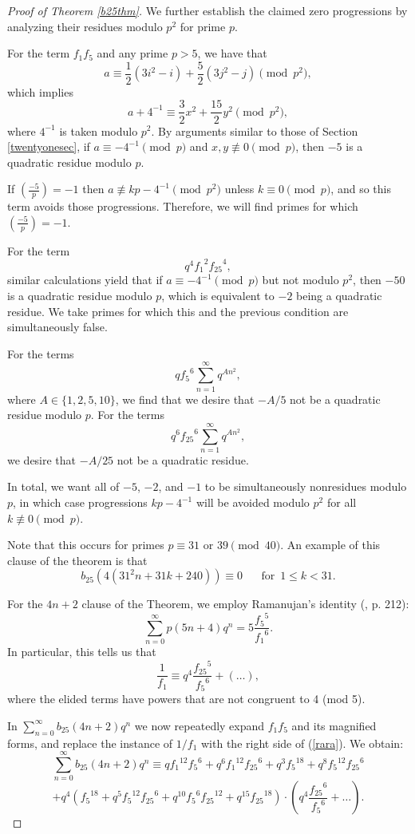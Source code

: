 \documentclass[12pt]{amsart}
\theoremstyle{definition}
\begin{document}
\begin{proof}[Proof of Theorem \ref{b25thm}]
We further establish the claimed zero progressions by analyzing their residues modulo $p^2$ for prime $p$.

For the term $f_1 f_5$ and any prime $p > 5$, we have that $$a \equiv \frac{1}{2}(3i^2-i) + \frac{5}{2}(3j^2 - j) \pmod{p^2},$$
which implies $$a + 4^{-1} \equiv \frac{3}{2} x^2 + \frac{15}{2} y^2 \pmod{p^2},$$
where $4^{-1}$ is taken modulo $p^2$.  By arguments similar to those of Section \ref{twentyonesec}, if $a \equiv -4^{-1} \pmod{p}$ and $x, y \not\equiv 0 \pmod{p}$, then $-5$ is a quadratic residue modulo $p$.  

If $(\frac{-5}{p}) = -1$ then $a \not\equiv kp-4^{-1} \pmod{p^2}$ unless $k \equiv 0 \pmod{p}$, and so this term avoids those progressions.  Therefore, we will find primes for which $(\frac{-5}{p}) = -1$.

For the term $$q^4 {f_1}^2 {f_{25}}^4,$$
similar calculations yield that if $a \equiv -4^{-1} \pmod{p}$ but not modulo $p^2$, then $-50$ is a quadratic residue modulo $p$, which is equivalent to $-2$ being a quadratic residue.  We take primes for which this and the previous condition are simultaneously false.

For the terms $$q {f_5}^6 \sum_{n=1}^\infty q^{An^2},$$
where $A \in \{1, 2, 5, 10\}$, we find that we desire that $-A/5$ not be a quadratic residue modulo $p$. For the terms
$$q^6 {f_{25}}^6 \sum_{n=1}^\infty q^{An^2},$$
we desire that $-A/25$ not be a quadratic residue.

In total, we want all of $-5$, $-2$, and $-1$ to be simultaneously nonresidues modulo $p$, in which case progressions $kp - 4^{-1}$ will be avoided modulo $p^2$ for all $k \not\equiv 0 \pmod{p}$.  

Note that this occurs for primes $p \equiv 31$ or $39 \pmod{40}$.  An example of this clause of the theorem is that $$b_{25}(4(31^2 n + 31k + 240)) \equiv 0  \, \quad \, \text{ for } \, 1 \leq k < 31.$$

For the $4n+2$ clause of the Theorem, we employ Ramanujan's identity (\cite{Ramanujan}, p. 212):
$$\sum_{n=0}^\infty p(5n+4) q^n = 5 \frac{{f_5}^5}{{f_1}^6}.$$
In particular, this tells us that
\begin{equation}\label{rara}
\frac{1}{f_1} \equiv q^4 \frac{{f_{25}}^5}{{f_5}^6} + \left( \dots \right),
\end{equation}
where the elided terms have powers that are not congruent to 4 (mod 5).

In $\sum_{n=0}^\infty b_{25}(4n+2) q^n$ we now repeatedly expand $f_1 f_5$ and its magnified forms, and replace the instance of $1/f_1$ with the right side of (\ref{rara}).  We obtain:
$$\sum_{n=0}^\infty b_{25}(4n+2) q^n \equiv q {f_1}^{12} {f_5}^6 + q^6 {f_1}^{12} {f_{25}}^6 + q^3 {f_5}^{18} + q^8 {f_5}^{12} {f_{25}}^6 $$$$+ q^4 ( {f_5}^{18} + q^5 {f_5}^{12} {f_{25}}^6 + q^{10} {f_5}^6 {f_{25}}^{12} + q^{15} {f_{25}}^{18} ) \cdot \left( q^4 \frac{{f_{25}}^6}{{f_5}^6} + \dots \right) .$$


\end{proof}
\end{document}
